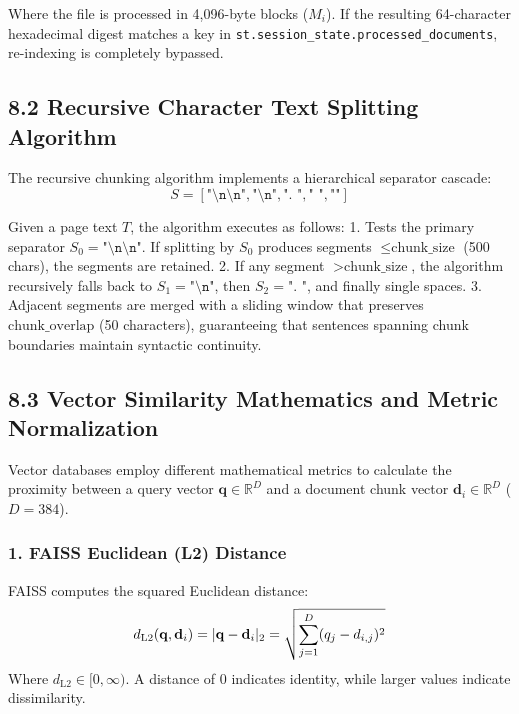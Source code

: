\documentclass[
]{article}
\begin{document}
Where the file is processed in 4,096-byte blocks (\(M_i\)). If the
resulting 64-character hexadecimal digest matches a key in
\texttt{st.\allowbreak session\_\allowbreak state.\allowbreak processed\_\allowbreak documents}, re-indexing is
completely bypassed.

\subsection{8.2 Recursive Character Text Splitting
Algorithm}\label{recursive-character-text-splitting-algorithm}

The recursive chunking algorithm implements a hierarchical separator
cascade:
\[S = [\texttt{"\textbackslash n\textbackslash n"}, \texttt{"\textbackslash n"}, \texttt{". "}, \texttt{" "}, \texttt{""}]\]

Given a page text \(T\), the algorithm executes as follows: 1. Tests the
primary separator \(S_0 = \texttt{"\textbackslash n\textbackslash n"}\).
If splitting by \(S_0\) produces segments \(\le \text{chunk\_size}\)
(500 chars), the segments are retained. 2. If any segment
\(> \text{chunk\_size}\), the algorithm recursively falls back to
\(S_1 = \texttt{"\textbackslash n"}\), then \(S_2 = \text{". "}\), and
finally single spaces. 3. Adjacent segments are merged with a sliding
window that preserves \(\text{chunk\_overlap}\) (50 characters),
guaranteeing that sentences spanning chunk boundaries maintain syntactic
continuity.

\subsection{8.3 Vector Similarity Mathematics and Metric
Normalization}\label{vector-similarity-mathematics-and-metric-normalization}

Vector databases employ different mathematical metrics to calculate the
proximity between a query vector \(\mathbf{q} \in \mathbb{R}^D\) and a
document chunk vector \(\mathbf{d}_i \in \mathbb{R}^D\) (\(D = 384\)).

\subsubsection{1. FAISS Euclidean (L2)
Distance}\label{faiss-euclidean-l2-distance}

FAISS computes the squared Euclidean distance:
\[d_{\text{L2}}(\mathbf{q}, \mathbf{d}_i) = \\|\mathbf{q} - \mathbf{d}_i\\|_2 = \sqrt{\sum_{j=1}^D (q_j - d_{i,j})^2}\]
Where \(d_{\text{L2}} \in [0, \infty)\). A distance of \(0\) indicates
identity, while larger values indicate dissimilarity.
\end{document}
